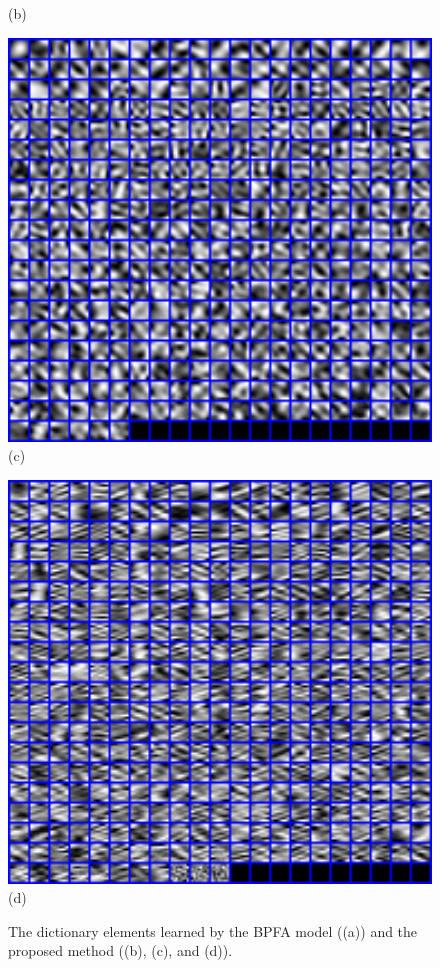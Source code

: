 \documentclass[runningheads]{llncs}
\begin{document}
\begin{figure}
{\begin{minipage}{0.24\textwidth}
{\footnotesize (b)}
\end{minipage}
\begin{minipage}{0.24\textwidth}
\centering
\includegraphics[width=1\textwidth]{barbara_Iteration8_dict3.png}
{\footnotesize (c)}
\end{minipage}
\begin{minipage}{0.24\textwidth}
\centering
\includegraphics[width=1\textwidth]{barbara_Iteration8_dict4.png}
{\footnotesize (d)}
\end{minipage}
}\vspace{-0.15in}
\caption{The dictionary elements learned by the BPFA model ((a)) and the proposed method ((b), (c), and (d)).}
\label{fig3}
\end{figure}
\end{document}
